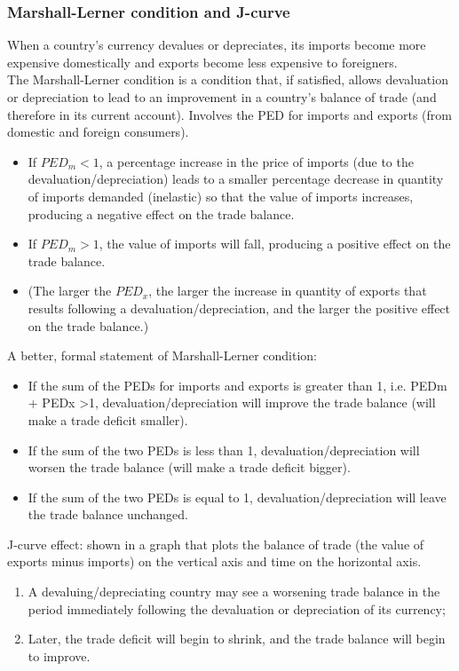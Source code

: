 \subsubsection*{Marshall-Lerner condition and J-curve}
When a country's currency devalues or depreciates, its imports become more expensive domestically and exports become less expensive to foreigners.\\
The Marshall-Lerner condition is a condition that, if satisfied, allows devaluation or depreciation to lead to an improvement in a country's balance of trade (and therefore in its current account). Involves the PED for imports and exports (from domestic and foreign consumers).
\begin{itemize}
  \item If $PED_m<1$, a percentage increase in the price of imports (due to the devaluation/depreciation) leads to a smaller percentage decrease in quantity of imports demanded (inelastic) so that the value of imports increases, producing a negative effect on the trade balance.
  \item If $PED_m>1$, the value of imports will fall, producing a positive effect on the trade balance.
  \item (The larger the $PED_x$, the larger the increase in quantity of exports that results following a devaluation/depreciation, and the larger the positive effect on the trade balance.)
\end{itemize}
A better, formal statement of Marshall-Lerner condition:
\begin{itemize}
  \item If the sum of the PEDs for imports and exports is greater than 1, i.e. PEDm + PEDx >1, devaluation/depreciation will improve the trade balance (will make a trade deficit smaller).
  \item If the sum of the two PEDs is less than 1, devaluation/depreciation will worsen the trade balance (will make a trade deficit bigger).
  \item If the sum of the two PEDs is equal to 1, devaluation/depreciation will leave the trade balance unchanged.
\end{itemize}
J-curve effect: shown in a graph that plots the balance of trade (the value of exports minus imports) on the vertical axis and time on the horizontal axis. 
\begin{enumerate}
  \item A devaluing/depreciating country may see a worsening trade balance in the period immediately following the devaluation or depreciation of its currency;
  \item Later, the trade deficit will begin to shrink, and the trade balance will begin to improve.
\end{enumerate}
